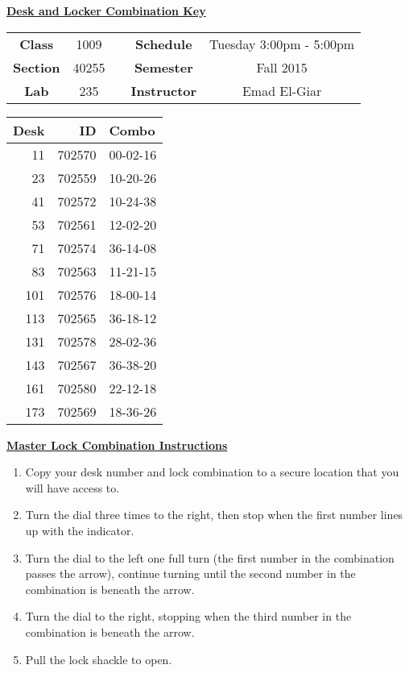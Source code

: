 \documentclass[12pt]{article}
\begin{document}
\thispagestyle{empty}

\begin{center}
	{\huge\textbf{\underline{ Desk and Locker Combination Key}}}
\end{center}


\begin{table}[h]
  \centering
  \begin{tabular}{ccccc}

  \textbf{Class} & 1009 & {\qquad} &\textbf{Schedule} & Tuesday 3:00pm - 5:00pm \\
  \textbf{Section} & 40255 & {\qquad} & \textbf{Semester} & Fall 2015 \\
  \textbf{Lab} & 235 & {\qquad} & \textbf{Instructor} & Emad El-Giar \\
  \end{tabular}
\end{table}
 \vspace{0.5in}
\begin{minipage}{0.4\textwidth}

\begin{tabular}{rrl}
\toprule
 Desk &      ID &     Combo \\
\midrule
   11 &  702570 &  00-02-16 \\
   23 &  702559 &  10-20-26 \\
   41 &  702572 &  10-24-38 \\
   53 &  702561 &  12-02-20 \\
   71 &  702574 &  36-14-08 \\
   83 &  702563 &  11-21-15 \\
  101 &  702576 &  18-00-14 \\
  113 &  702565 &  36-18-12 \\
  131 &  702578 &  28-02-36 \\
  143 &  702567 &  36-38-20 \\
  161 &  702580 &  22-12-18 \\
  173 &  702569 &  18-36-26 \\
\bottomrule
\end{tabular}


\end{minipage}
\begin{minipage}{0.4\textwidth}
\underline{{\large \textbf{Master Lock Combination Instructions}}}
\begin{enumerate}
\item Copy your desk number and lock combination to a secure location that you will have access to.
\item Turn the dial three times to the right, then stop when the first number lines up with the indicator.
\item Turn the dial to the left one full turn (the first number in the combination passes the arrow), continue turning until the second number in the combination is beneath the arrow.
\item Turn the dial to the right, stopping when the third number in the combination is beneath the arrow.
\item Pull the lock shackle to open.
\end{enumerate}
\end{minipage}
\end{document}
